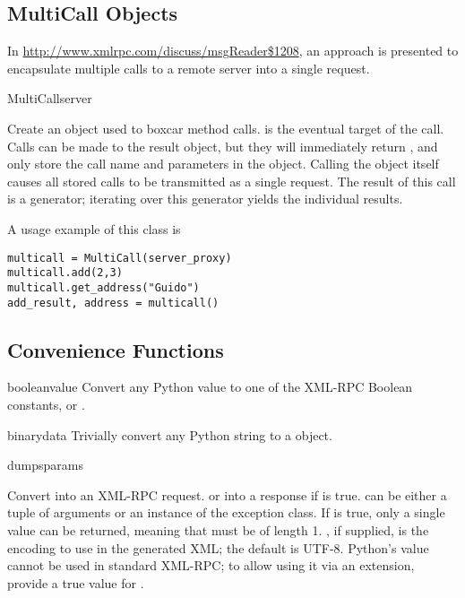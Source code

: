 \subsection{MultiCall Objects}


In \url{http://www.xmlrpc.com/discuss/msgReader\$1208}, an approach
is presented to encapsulate multiple calls to a remote server into
a single request.

\begin{classdesc}{MultiCall}{server}

Create an object used to boxcar method calls.  is the
eventual target of the call. Calls can be made to the result object,
but they will immediately return , and only store the
call name and parameters in the  object. Calling
the object itself causes all stored calls to be transmitted as
a single  request. The result of this call
is a generator; iterating over this generator yields the individual
results.

\end{classdesc}

A usage example of this class is

\begin{verbatim}
multicall = MultiCall(server_proxy)
multicall.add(2,3)
multicall.get_address("Guido")
add_result, address = multicall()
\end{verbatim}

\subsection{Convenience Functions}

\begin{funcdesc}{boolean}{value}
Convert any Python value to one of the XML-RPC Boolean constants,
 or .
\end{funcdesc}

\begin{funcdesc}{binary}{data}
Trivially convert any Python string to a  object.
\end{funcdesc}

\begin{funcdesc}{dumps}{params}

Convert  into an XML-RPC request.
or into a response if  is true.
 can be either a tuple of arguments or an instance of the 
 exception class.  If  is true,
only a single value can be returned, meaning that  must be of length 1.
, if supplied, is the encoding to use in the generated
XML; the default is UTF-8.  Python's  value cannot be
used in standard XML-RPC; to allow using it via an extension, 
provide a true value for .
\end{funcdesc}

